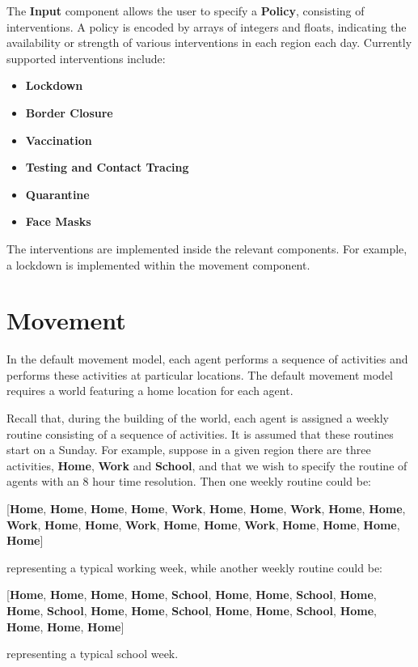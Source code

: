 \documentclass[10pt,letterpaper]{article}
\begin{document}
The \textbf{Input} component allows the user to specify a \textbf{Policy}, consisting of interventions. A policy is encoded by arrays of integers and floats, indicating the availability or strength of various interventions in each region each day. Currently supported interventions include:
\begin{itemize}
\item \textbf{Lockdown}
\item \textbf{Border Closure}
\item \textbf{Vaccination}
\item \textbf{Testing and Contact Tracing}
\item \textbf{Quarantine}
\item \textbf{Face Masks}
\end{itemize}
The interventions are implemented inside the relevant components. For example, a lockdown is implemented within the movement component.

\section{Movement}

In the default movement model, each agent performs a sequence of activities and performs these activities at particular locations. The default movement model requires a world featuring a home location for each agent.

Recall that, during the building of the world, each agent is assigned a weekly routine consisting of a sequence of activities. It is assumed that these routines start on a Sunday. For example, suppose in a given region there are three activities, \textbf{Home}, \textbf{Work} and \textbf{School}, and that we wish to specify the routine of agents with an 8 hour time resolution. Then one weekly routine could be:
\begin{center}
[\textbf{Home}, \textbf{Home}, \textbf{Home}, \textbf{Home}, \textbf{Work}, \textbf{Home}, \textbf{Home}, \textbf{Work}, \textbf{Home}, \textbf{Home}, \textbf{Work}, \textbf{Home}, \textbf{Home}, \textbf{Work}, \textbf{Home}, \textbf{Home}, \textbf{Work}, \textbf{Home}, \textbf{Home}, \textbf{Home}, \textbf{Home}]
\end{center}
representing a typical working week, while another weekly routine could be:
\begin{center}
[\textbf{Home}, \textbf{Home}, \textbf{Home}, \textbf{Home}, \textbf{School}, \textbf{Home}, \textbf{Home}, \textbf{School}, \textbf{Home}, \textbf{Home}, \textbf{School}, \textbf{Home}, \textbf{Home}, \textbf{School}, \textbf{Home}, \textbf{Home}, \textbf{School}, \textbf{Home}, \textbf{Home}, \textbf{Home}, \textbf{Home}]
\end{center}
representing a typical school week.
\end{document}

